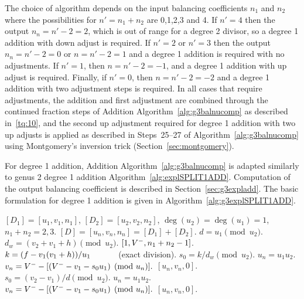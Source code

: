 The choice of algorithm depends on the input balancing coefficients $n_1$ and
$n_2$ where the possibilities for $n' =n_1 + n_2$ are 0,1,2,3 and 4. If $n' = 4$
then the output $n_n = n'-2 = 2$, which is out of range for a degree 2 divisor,
so a degree 1 addition with down adjust is required. If $n' = 2$ or $n' =3$ then
the output $n_n = n'-2 = 0$ or $n = n'-2 = 1$ and a degree 1 addition is
required with no adjustments. If $n'=1$, then $n = n' - 2= -1$, and a degree 1
addition with up adjust is required. Finally, if $n' = 0$, then $n = n' - 2 =
-2$ and a degree 1 addition with two adjustment steps is required. In all cases
that require adjustments, the addition and first adjustment are combined through
the continued fraction steps of Addition Algorithm~\ref{alg:g3balnucomp} as
described in~\ref{tq:10}, and the second up adjustment required for degree 1
addition with two up adjusts is applied as described in Steps~25--27 of
Algorithm~\ref{alg:g3balnucomp} using Montgomery's inversion trick
(Section~\ref{sec:montgomery}). 

For degree 1 addition, Addition Algorithm~\ref{alg:g3balnucomp} is adapted
similarly to genus 2 degree 1 addition Algorithm~\ref{alg:explSPLIT1ADD}.
Computation of the output balancing coefficient is described in
Section~\ref{sec:g3expladd}. The basic formulation for degree 1 addition is given
in Algorithm~\ref{alg:g3explSPLIT1ADD}.

\begin{algorithm}[H]
\caption{Genus 3 Split Model Degree 1 Addition\label{alg:g3explSPLIT1ADD}}
\begin{algorithmic} [1]
\Require $[D_1] = [u_1,v_1,n_1]$, $[D_2] = [u_2,v_2,n_2]$, $\deg(u_2) = \deg(u_1) = 1$, $n_1 + n_2 = 2,3$.
\Ensure $[D] = [u_n,v_n,n_n] = [D_1] + [D_2] $.
\algrule
\vspace{-2pt}
\State $d = u_1 \pmod{u_2}$.
    \State $d_w = (v_2 + v_1 + h) \pmod{u_2}$.
     \hspace{3pt} \Return $[1,V^{-}, n_1 + n_2 - 1]$.
    \EndIf
    \State $k = (f - v_1(v_1 + h))/u_1 \quad\quad\quad$ (exact division).  
    \State $s_0 = k/d_w \pmod{u_2}$.
    \State $u_n = u_1u_2$.
    \State $v_n = V^{-} - [(V^{-} - v_1 - s_0u_1) \pmod{u_n}].$ 
    \State \Return $[u_n,v_n,0]$.
\EndIf
\State $s_0 = (v_2 - v_1)/d \pmod{u_2}$.
\State $u_n = u_1u_2$.
\State $v_n = V^{-} - [(V^{-} - v_1 - s_0u_1) \pmod{u_n}].$ 
\State \Return $[u_n,v_n,0]$.
\vspace{-2pt}
\end{algorithmic}
\end{algorithm}

